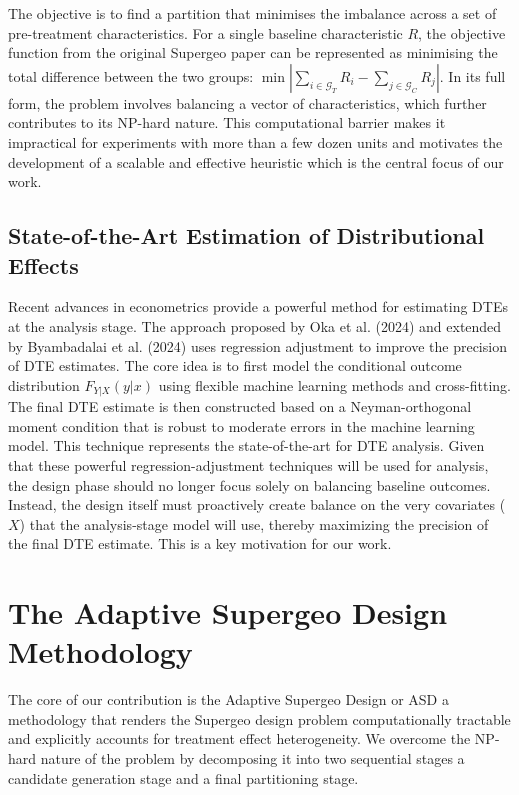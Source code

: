 \documentclass[final,3p,fleqn, 10pt]{elsarticle}
\begin{document}
    The objective is to find a partition that minimises the imbalance across a set of pre-treatment characteristics. For a single baseline characteristic $R$, the objective function from the original Supergeo paper can be represented as minimising the total difference between the two groups: $\min |\sum_{i \in \mathcal{G}_T} R_i - \sum_{j \in \mathcal{G}_C} R_j|$. In its full form, the problem involves balancing a vector of characteristics, which further contributes to its NP-hard nature. This computational barrier makes it impractical for experiments with more than a few dozen units and motivates the development of a scalable and effective heuristic which is the central focus of our work.

    \subsection{State-of-the-Art Estimation of Distributional Effects}
    Recent advances in econometrics provide a powerful method for estimating DTEs at the analysis stage. The approach proposed by Oka et al. (2024) and extended by Byambadalai et al. (2024) uses regression adjustment to improve the precision of DTE estimates. The core idea is to first model the conditional outcome distribution $F_{Y|X}(y|x)$ using flexible machine learning methods and cross-fitting. The final DTE estimate is then constructed based on a Neyman-orthogonal moment condition that is robust to moderate errors in the machine learning model. This technique represents the state-of-the-art for DTE analysis. Given that these powerful regression-adjustment techniques will be used for analysis, the design phase should no longer focus solely on balancing baseline outcomes. Instead, the design itself must proactively create balance on the very covariates ($X$) that the analysis-stage model will use, thereby maximizing the precision of the final DTE estimate. This is a key motivation for our work.

\section{The Adaptive Supergeo Design Methodology}
\label{sec:methodology}
The core of our contribution is the Adaptive Supergeo Design or ASD a methodology that renders the Supergeo design problem computationally tractable and explicitly accounts for treatment effect heterogeneity. We overcome the NP-hard nature of the problem by decomposing it into two sequential stages a candidate generation stage and a final partitioning stage.
\end{document}
